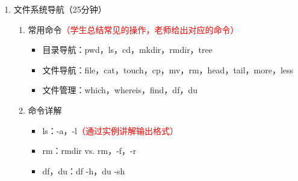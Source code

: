 \documentclass{TIJMUjiaoanLL}
\begin{document}
\begin{enumerate}
  \item 文件系统导航（25分钟）
    \begin{enumerate}
      \item 常用命令\textcolor{red}{（学生总结常见的操作，老师给出对应的命令）}
	\begin{itemize}
	  \item 目录导航：pwd，ls，cd，mkdir，rmdir，tree
	  \item 文件导航：file，cat，touch，cp，mv，rm，head，tail，more，less
	  \item 文件管理：which，whereis，find，df，du
	\end{itemize}
      \item 命令详解
	\begin{itemize}
	  \item ls：-a，-l\textcolor{red}{（通过实例讲解输出格式）}
	  \item rm：rmdir vs. rm，-f，-r
	  \item df，du：df -h，du -sh
	\end{itemize}
    \end{enumerate}

\otherTail
\newpage
\otherHeader


\end{enumerate}
\end{document}
